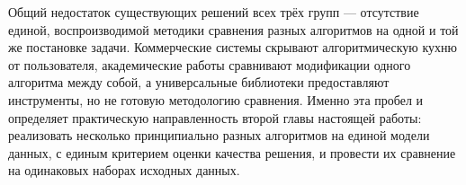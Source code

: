 Общий недостаток существующих решений всех трёх групп — отсутствие единой, воспроизводимой методики сравнения разных алгоритмов на одной и той же постановке задачи. Коммерческие системы скрывают алгоритмическую кухню от пользователя, академические работы сравнивают модификации одного алгоритма между собой, а универсальные библиотеки предоставляют инструменты, но не готовую методологию сравнения. Именно эта пробел и определяет практическую направленность второй главы настоящей работы: реализовать несколько принципиально разных алгоритмов на единой модели данных, с единым критерием оценки качества решения, и провести их сравнение на одинаковых наборах исходных данных.
